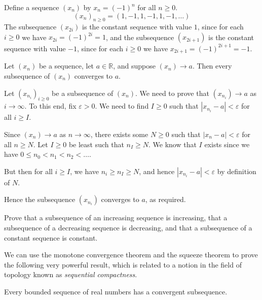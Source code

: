 \begin{example}
Define a sequence $(x_n)$ by $x_n = (-1)^n$ for all $n \ge 0$.
\[ (x_n)_{n \ge 0} = (1, {-1}, 1, {-1}, 1, {-1}, \dots) \]
The subsequence $(x_{2i})$ is the constant sequence with value $1$, since for each $i \ge 0$ we have $x_{2i} = (-1)^{2i} = 1$, and the subsequence $(x_{2i+1})$ is the constant sequence with value $-1$, since for each $i \ge 0$ we have $x_{2i+1} = (-1)^{2i+1} = -1$.
\end{example}

\begin{theorem}
Let $(x_n)$ be a sequence, let $a \in \mathbb{R}$, and suppose $(x_n) \to a$. Then every subsequence of $(x_n)$ converges to $a$.
\end{theorem}

\begin{cproof}
Let $(x_{n_i})_{i \ge 0}$ be a subsequence of $(x_n)$. We need to prove that $(x_{n_i}) \to a$ as $i \to \infty$. To this end, fix $\varepsilon > 0$. We need to find $I \ge 0$ such that $|x_{n_i} - a| < \varepsilon$ for all $i \ge I$.

Since $(x_n) \to a$ as $n \to \infty$, there exists some $N \ge 0$ such that $|x_n-a| < \varepsilon$ for all $n \ge N$. Let $I \ge 0$ be least such that $n_I \ge N$. We know that $I$ exists since we have $0 \le n_0 < n_1 < n_2 < \dots$.

But then for all $i \ge I$, we have $n_i \ge n_I \ge N$, and hence $|x_{n_i} - a| < \varepsilon$ by definition of $N$.

Hence the subsequence $(x_{n_i})$ converges to $a$, as required.
\end{cproof}

\begin{exercise}
Prove that a subsequence of an increasing sequence is increasing, that a subsequence of a decreasing sequence is decreasing, and that a subsequence of a constant sequence is constant.
\end{exercise}

We can use the monotone convergence theorem and the squeeze theorem to prove the following very powerful result, which is related to a notion in the field of topology known as \textit{sequential compactness}.

\begin{theorem}
\label{thmBolzanoWeierstrass}
Every bounded sequence of real numbers has a convergent subsequence.
\end{theorem}

